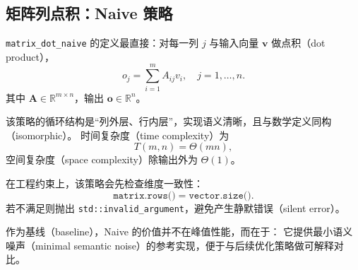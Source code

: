 \subsection{矩阵列点积：Naive 策略}

\texttt{matrix\_dot\_naive} 的定义最直接：对每一列 \(j\) 与输入向量 \(\mathbf{v}\) 做点积（dot product），
\begin{equation}
 o_j = \sum_{i=1}^{m} A_{ij}v_i,\quad j=1,\dots,n.
\end{equation}
其中 \(\mathbf{A}\in\mathbb{R}^{m\times n}\)，输出 \(\mathbf{o}\in\mathbb{R}^{n}\)。

该策略的循环结构是“列外层、行内层”，实现语义清晰，且与数学定义同构（isomorphic）。
时间复杂度（time complexity）为
\begin{equation}
T(m,n)=\Theta(mn),
\end{equation}
空间复杂度（space complexity）除输出外为 \(\Theta(1)\)。

在工程约束上，该策略会先检查维度一致性：
\begin{equation}
\texttt{matrix.rows()} = \texttt{vector.size()}.
\end{equation}
若不满足则抛出 \texttt{std::invalid\_argument}，避免产生静默错误（silent error）。

作为基线（baseline），Naive 的价值并不在峰值性能，而在于：
它提供最小语义噪声（minimal semantic noise）的参考实现，便于与后续优化策略做可解释对比。
